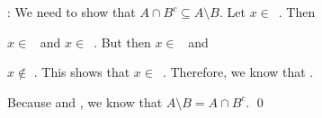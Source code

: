 \documentclass[11pt,letterpaper]{article}
\begin{document}
\underline{\hspace{3cm}}: We need to show that $A \cap B^c \subseteq A \setminus B$. Let $x \in$~\underline{\hspace{3cm}}. Then \pspace

$x \in$~\underline{\hspace{3cm}} and $x \in$~\underline{\hspace{3cm}}. But then $x \in$~\underline{\hspace{3cm}} and \pspace

$x \notin$ \underline{\hspace{3cm}}. This shows that $x \in$~\underline{\hspace{3cm}}. Therefore, we know that \underline{\hspace{3cm}}. \par\vspace{3\baselineskip}

Because \underline{\hspace{3cm}} and \underline{\hspace{3cm}}, we know that $A \setminus B= A \cap B^c$. \qed
\end{document}
